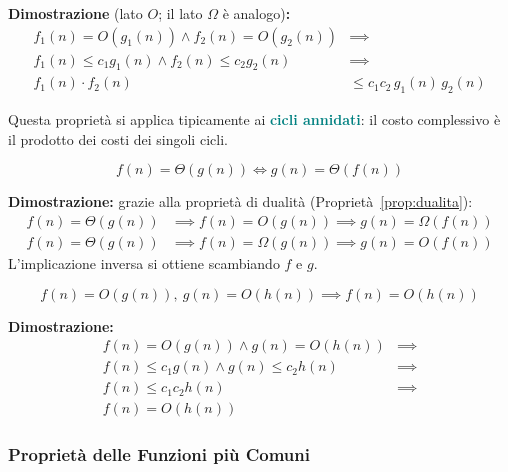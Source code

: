 \documentclass[12pt, a4paper]{article}
\begin{document}
\textbf{Dimostrazione} (lato $O$; il lato $\Omega$ è analogo)\textbf{:}
\begin{align*}
f_1(n) = O(g_1(n)) \wedge f_2(n) = O(g_2(n)) &\implies \\
f_1(n) \le c_1 g_1(n) \wedge f_2(n) \le c_2 g_2(n) &\implies \\
f_1(n)\cdot f_2(n) &\le c_1 c_2\, g_1(n)\,g_2(n)
\end{align*}

\begin{tcolorbox}[colback=lightergray!5, colframe=tocsubsec, title=\textbf{Osservazione}]
Questa proprietà si applica tipicamente ai \textcolor{teal}{\textbf{cicli annidati}}: il costo complessivo è il prodotto dei costi dei singoli cicli.
\end{tcolorbox}

\begin{tcolorbox}[colback=lightergray!10, colframe=tocsec, title=\textbf{Proprietà: Simmetria}]
\label{prop:simmetria}
$$f(n) = \Theta(g(n)) \iff g(n) = \Theta(f(n))$$
\end{tcolorbox}

\textbf{Dimostrazione:} grazie alla proprietà di dualità (Proprietà~\ref{prop:dualita}):
\begin{align*}
f(n) = \Theta(g(n)) &\implies f(n) = O(g(n)) \implies g(n) = \Omega(f(n)) \\
f(n) = \Theta(g(n)) &\implies f(n) = \Omega(g(n)) \implies g(n) = O(f(n))
\end{align*}
L'implicazione inversa si ottiene scambiando $f$ e $g$.

\begin{tcolorbox}[colback=lightergray!10, colframe=tocsec, title=\textbf{Proprietà: Transitività}]
\label{prop:transitivita}
$$f(n) = O(g(n)),\ g(n) = O(h(n)) \implies f(n) = O(h(n))$$
\end{tcolorbox}

\textbf{Dimostrazione:}
\begin{align*}
f(n) = O(g(n)) \wedge g(n) = O(h(n)) &\implies \\
f(n) \le c_1 g(n) \wedge g(n) \le c_2 h(n) &\implies \\
f(n) \le c_1 c_2 h(n) &\implies \\
f(n) = O(h(n))
\end{align*}



\subsubsection{Proprietà delle Funzioni più Comuni}
\end{document}

